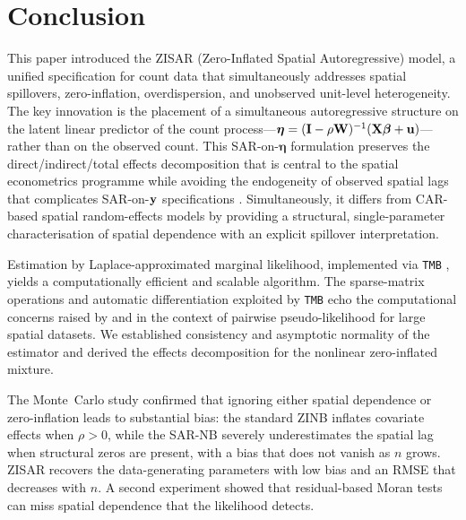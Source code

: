 \section{Conclusion}\label{sec:conclusion}

This paper introduced the ZISAR (Zero-Inflated Spatial Autoregressive) model, a unified specification for count data that simultaneously addresses spatial spillovers, zero-inflation, overdispersion, and unobserved unit-level heterogeneity.
The key innovation is the placement of a simultaneous autoregressive structure on the latent linear predictor of the count process---$\boldsymbol{\eta} = (\mathbf{I} - \rho\mathbf{W})^{-1}(\mathbf{X}\boldsymbol{\beta} + \mathbf{u})$---rather than on the observed count.
This SAR-on-$\boldsymbol{\eta}$ formulation preserves the direct/indirect/total effects decomposition that is central to the spatial econometrics programme \citep{lesage_pace2009,arbia2006} while avoiding the endogeneity of observed spatial lags that complicates SAR-on-$\mathbf{y}$ specifications \citep{lambert2010}.
Simultaneously, it differs from CAR-based spatial random-effects models \citep{lee2013,neelon2013} by providing a structural, single-parameter characterisation of spatial dependence with an explicit spillover interpretation.

Estimation by Laplace-approximated marginal likelihood, implemented via \texttt{TMB} \citep{kristensen2016}, yields a computationally efficient and scalable algorithm.
The sparse-matrix operations and automatic differentiation exploited by \texttt{TMB} echo the computational concerns raised by \citet{arbia_nardelli2024} and \citet{arbia_nardelli_salvini} in the context of pairwise pseudo-likelihood for large spatial datasets.
We established consistency and asymptotic normality of the estimator and derived the effects decomposition for the nonlinear zero-inflated mixture.

The Monte~Carlo study confirmed that ignoring either spatial dependence or zero-inflation leads to substantial bias: the standard ZINB inflates covariate effects when $\rho > 0$, while the SAR-NB severely underestimates the spatial lag when structural zeros are present, with a bias that does not vanish as $n$ grows.
ZISAR recovers the data-generating parameters with low bias and an RMSE that decreases with $n$.
A second experiment showed that residual-based Moran tests can miss spatial dependence that the likelihood detects.

